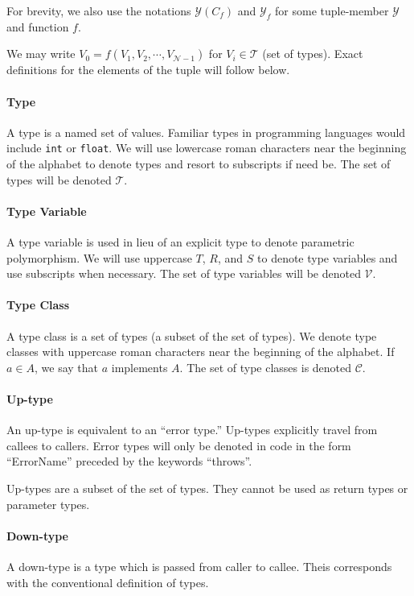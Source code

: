 \documentclass[10pt]{article}
\begin{document}
	For brevity, we also use the notations $\mathcal{Y}(C_f)$ and
	$\mathcal{Y}_f$ for some tuple-member $\mathcal{Y}$ and function $f$.

	We may write $V_0 = f(V_1, V_2, \cdots, V_{\mathcal{N}-1})$ for $V_i \in
	\mathcal{T}$ (set of types). Exact definitions for the elements of the
	tuple will follow below.
	
	\paragraph{Type}
	A type is a named set of values. Familiar types in programming languages
	would include \texttt{int} or \texttt{float}. We will
	use lowercase roman characters near the beginning of the alphabet to denote
	types and resort to subscripts if need be. The set of types will be denoted
	$\mathcal{T}$.
	
	\paragraph{Type Variable}
	A type variable is used in lieu of an explicit type to denote parametric
	polymorphism. We will use uppercase $T$, $R$, and $S$ to denote type
	variables and use subscripts when necessary. The set of type variables will
	be denoted $\mathcal{V}$.
	
	\paragraph{Type Class}
	A type class is a set of types (a subset of the set of types). We denote
	type classes with uppercase roman characters near the beginning of the
	alphabet. If $a \in A$, we say that $a$ implements $A$. The set of type
	classes is denoted $\mathcal{C}$.
	
	\paragraph{Up-type}
	An up-type is equivalent to an ``error type.''  Up-types explicitly travel
	from callees to callers. Error types will only be denoted in code in the
	form ``ErrorName'' preceded by the keywords ``throws''.

	Up-types are a subset of the set of types. They cannot be used as return
	types or parameter types.
	
	\paragraph{Down-type}
	A down-type is a type which is passed from caller to callee. Theis
	corresponds with the conventional definition of types. 
	
\end{document}
